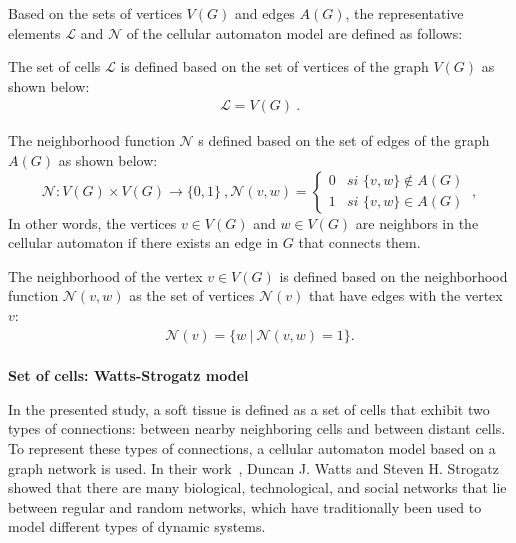 \documentclass[a4paper,11pt]{article}
\begin{document}
{Based on the sets of vertices $V(G)$ and edges $A(G)$, the representative elements $\mathcal{L}$ and $\mathcal{N}$ of the cellular automaton model are defined as follows:

The set of cells $\mathcal{L}$ is defined based on the set of vertices of the graph $V(G)$ as shown below:
\begin{align}
\boxed{\mathcal{L} = V(G)}~. \label{eq-L}
\end{align}

The neighborhood function $\mathcal{N}$ s defined based on the set of edges of the graph $A(G)$ as shown below:
\begin{subequations}
\begin{equation}
\boxed{\mathcal{N} : V(G) \times V(G) \rightarrow \lbrace 0,1 \rbrace}~, \label{eq-N}
\end{equation}
\begin{equation}
\boxed{\mathcal{N}(v,w) = \left\lbrace
	\begin{array}{lr}
		0& \textit{si } \lbrace v,w \rbrace \notin A(G)\\
		1& \textit{si } \lbrace v,w \rbrace \in A(G)
	\end{array}
\right.}~, \label{eq-N-2}
\end{equation}
\end{subequations}
In other words, the vertices $v \in V(G)$ and $w \in V(G)$  are neighbors in the cellular automaton if there exists an edge in $G$ that connects them.

The neighborhood of the vertex $v \in V(G)$ is defined based on the neighborhood function $\mathcal{N}(v,w)$   as the set of vertices $\mathcal{N}(v)$  that have edges with the vertex $v$:
\begin{align} 
\mathcal{N}(v) = \lbrace w~|~\mathcal{N}(v,w)=1 \rbrace. \label{eq-neighbourhood}
\end{align}
\\
\textbf{Set of cells: Watts-Strogatz model}

In the presented study, a soft tissue is defined as a set of cells that exhibit two types of connections: between nearby neighboring cells and between distant cells. To represent these types of connections, a cellular automaton model based on a graph network is used. In their work~\cite{9}, Duncan J. Watts and Steven H. Strogatz showed that there are many biological, technological, and social networks that lie between regular and random networks, which have traditionally been used to model different types of dynamic systems.

}
\end{document}
